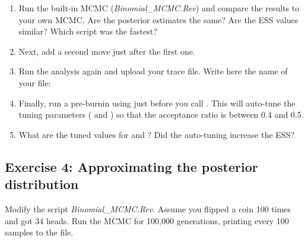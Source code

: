\begin{enumerate}[label=\textnormal{\arabic*)}]
	\item Run the built-in MCMC (\emph{Binomial\_MCMC.Rev}) and compare the results to your own MCMC. Are the posterior estimates the same? Are the ESS values similar? Which script was the fastest?\medskip\\
\TextField[name=mcmc_builtin,,backgroundcolor=TextFieldBackgroundColor,color=TextFieldTextColor,bordercolor=TextFieldBoxColor,height=2cm,width=\TextFieldWidth,multiline=true]{}
	\item Next, add a second move  just after the first one.
	\item Run the analysis again and upload your trace file. Write here the name of your file:\medskip\\
\TextField[name=mcmc_trace_builtin,,backgroundcolor=TextFieldBackgroundColor,color=TextFieldTextColor,bordercolor=TextFieldBoxColor,height=1cm,width=\TextFieldWidth,multiline=true]{}
	\item Finally, run a pre-burnin using  just before you call . This will auto-tune the tuning parameters (\EG {} and ) so that the acceptance ratio is between 0.4 and 0.5.
	\item What are the tuned values for  and ? Did the auto-tuning increase the ESS?\medskip\\
\TextField[name=mcmc_autotunig,backgroundcolor=,backgroundcolor=TextFieldBackgroundColor,color=TextFieldTextColor,bordercolor=TextFieldBoxColor,height=2cm,width=\TextFieldWidth,multiline=true]{}
\end{enumerate}


\subsection{Exercise 4: Approximating the posterior distribution}

Modify the script \emph{Binomial\_MCMC.Rev}. Assume you flipped a coin 100 times and got 34 heads. Run the MCMC for 100,000 generations, printing every 100 samples to the file. 

